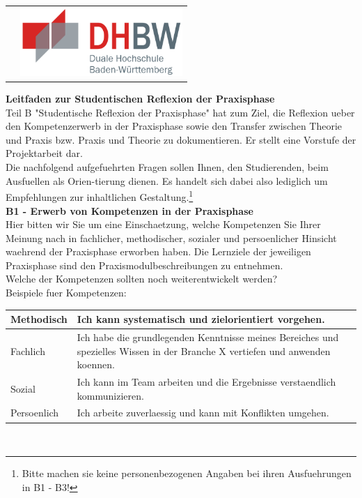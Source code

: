 	\begin{longtable}{p{} p{}}
	 & {\includegraphics[height=2.6cm]{images/dhbw.png}}
	\end{longtable}
	\enlargethispage{20mm}

\textbf{Leitfaden zur Studentischen Reflexion der Praxisphase}\\
Teil B "Studentische Reflexion der Praxisphase" hat zum Ziel, die Reflexion ueber den Kompetenzerwerb in der Praxisphase sowie den Transfer zwischen Theorie und Praxis bzw. Praxis und Theorie zu dokumentieren. Er stellt eine Vorstufe der Projektarbeit dar.\\
Die nachfolgend aufgefuehrten Fragen sollen Ihnen, den Studierenden, beim Ausfuellen als Orien-tierung dienen. Es handelt sich dabei also lediglich um Empfehlungen zur inhaltlichen Gestaltung.\footnote{Bitte machen sie keine personenbezogenen Angaben bei ihren Ausfuehrungen in B1 - B3!}\\
\textbf{B1 - Erwerb von Kompetenzen in der Praxisphase}\\
Hier bitten wir Sie um eine Einschaetzung, welche Kompetenzen Sie Ihrer Meinung nach in fachlicher, methodischer, sozialer und persoenlicher Hinsicht waehrend der Praxisphase erworben haben. Die Lernziele der jeweiligen Praxisphase sind den Praxismodulbeschreibungen zu entnehmen.\\
Welche der Kompetenzen sollten noch weiterentwickelt werden?\\
Beispiele fuer Kompetenzen:\\

	\begin{tabular}{|p{2cm}|p{12cm}|}
		\hline
		Methodisch & Ich kann systematisch und zielorientiert vorgehen.\\
		\hline
		Fachlich & Ich habe die grundlegenden Kenntnisse meines Bereiches und spezielles Wissen in der Branche X vertiefen und anwenden koennen.\\
		\hline
		Sozial & Ich kann im Team arbeiten und die Ergebnisse verstaendlich kommunizieren.\\
		\hline
		Persoenlich & Ich arbeite zuverlaessig und kann mit Konflikten umgehen.\\
		\hline
	\end{tabular}\\

